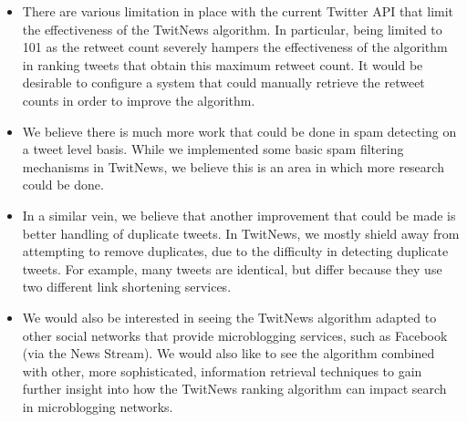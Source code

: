 \documentclass[10pt]{proc}
\begin{document}
\begin{itemize}
  \item
  There are various limitation in place with the current Twitter API that limit the effectiveness of the TwitNews algorithm. In particular, being limited to 101 as the retweet count severely hampers the effectiveness of the algorithm in ranking tweets that obtain this maximum retweet count. It would be desirable to configure a system that could manually retrieve the retweet counts in order to improve the algorithm.
  \item
  We believe there is much more work that could be done in spam detecting on a tweet level basis. While we implemented some basic spam filtering mechanisms in TwitNews, we believe this is an area in which more research could be done.
  \item
  In a similar vein, we believe that another improvement that could be made is better handling of duplicate tweets. In TwitNews, we mostly shield away from attempting to remove duplicates, due to the difficulty in detecting duplicate tweets. For example, many tweets are identical, but differ because they use two different link shortening services.
  \item
  We would also be interested in seeing the TwitNews algorithm adapted to other social networks that provide microblogging services, such as Facebook (via the News Stream). We would also like to see the algorithm combined with other, more sophisticated, information retrieval techniques to gain further insight into how the TwitNews ranking algorithm can impact search in microblogging networks.
\end{itemize}



\end{document}
